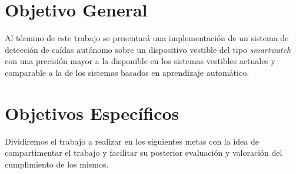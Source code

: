 \iffalse
Puente entre el estudio y la contribución. Debe contener:
 * objetivo general
 * objetivo específico
 * metodología de trabajo
 
Los objetivos deben ser \textit{SMART}

Specificl (objetivo claro)
Measurable (se pueda medir el éxito o fracaso)
Attainable (viable su conecución con el tiempo y recursos disponibles)
Relevant (que tenga un impacto demostrable)
Time-related (que se pueda realizar en un tiempo determinado)

Objetivos secundarios:
Conjunto de objetivos más específicos alcanzables por separado. suelen ser los diferentes pasos a seguir para conseguir el objetivo general. Han de ser smart, los verbos deberían ser:     • Analizar
Calcular
Clasificar
Comparar
Conocer
Cuantificar
Desarrollar
Describir
Descubrir
Determinar
Establecer
Explorar
Identificar
Indagar
Medir
Sintetizar
Verificar

Objetivo general
Un poco la descripción a grandes rasgos de qué se espera explicado al público general.
Ejemplo: Mejorar el servicio de audio gruía de un museo con una guía interactiva por voz valorada positivamente con un 4/5 al menos.

\fi

\section{Objetivo General}\label{sec:obj:objetivo_general}
Al término de este trabajo se presentará una implementación de un sistema de detección de caídas autónomo sobre un dispositivo vestible del tipo \textit{smartwatch} con una precisión mayor a la disponible en los sistemas vestibles actuales y comparable a la de los sistemas basados en aprendizaje automático.

\section{Objetivos Específicos}\label{sec:obj:objetivos_especificos}
Dividiremos el trabajo a realizar en los siguientes metas con la idea de compartimentar el trabajo y facilitar su posterior evaluación y valoración del cumplimiento de los mismos.

